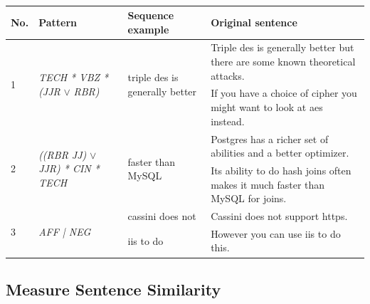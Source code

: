 

\begin{table}
	\centering
	\caption{ }
	\begin{tabular}{l|l|l|l}
		\hline 
		\textbf{No.} & \textbf{Pattern} & \textbf{Sequence example} & \textbf{Original sentence} \\ \hline
		\multirow{2}{*}{1} & \multirow{2}{*}{ \textit{TECH * VBZ * (JJR} $\lor$\textit{ RBR)}} & \multirow{2}{*}{triple des is generally better} & Triple des is generally better but there are some known theoretical attacks. \\ & & & If you have a choice of cipher you might want to look at aes instead. \\
		\hline
		\multirow{2}{*}{2} & \multirow{2}{*}{\textit{((RBR JJ) } $\lor$\textit{ JJR) * CIN * TECH}} & \multirow{2}{*}{faster than MySQL}  & Postgres has a richer set of abilities and a better optimizer.\\& & &  Its ability to do hash joins often makes it much faster than MySQL for joins. \\
		\hline
		\multirow{2}{*}{3} & \multirow{2}{*}{\textit{AFF | NEG}} & cassini does not & Cassini does not support https. \\ & &iis to do  & However you can use iis to do this.
		
	\end{tabular}
	\label{tab:patternMultiple}
\end{table}


\subsection{Measure Sentence Similarity}
\label{sec:measuresimilarity}

